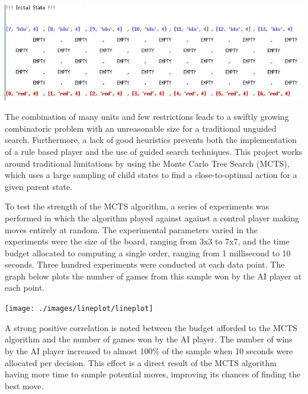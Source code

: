 \documentclass[landscape,final,a0paper,12pt]{baposter}
\begin{document}
\begin{poster}
{\vspace{0.3cm}

\includegraphics[width=0.9\colwidth]{./images/virtualboard_3.png}

\vspace{0.3cm}

The combination of many units and few restrictions leads to a swiftly growing combinatoric problem with an unreasonable size for a traditional unguided search.
Furthermore, a lack of good heuristics prevents both the implementation of a rule based player and the use of guided search techniques.
This project works around traditional limitations by using the Monte Carlo Tree Search (MCTS), which uses a large sampling of child states to find a close-to-optimal action for a given parent state.

}

{
To test the strength of the MCTS algorithm, a series of experiments was performed in which the algorithm played against against a control player making moves entirely at random.
The experimental parameters varied in the experiments were the size of the board, ranging from 3x3 to 7x7, and the time budget allocated to computing a single order, ranging from 1 millisecond to 10 seconds.
Three hundred experiments were conducted at each data point.
The graph below plots the number of games from this sample won by the AI player at each point.

\vspace{0.3cm}

\texttt{[image: ./images/lineplot/lineplot]}

\vspace{0.3cm}

A strong positive correlation is noted between the budget afforded to the MCTS algorithm and the number of games won by the AI player.
The number of wins by the AI player increased to almost 100\% of the sample when 10 seconds were allocated per decision.
This effect is a direct result of the MCTS algorithm having more time to sample potential moves, improving its chances of finding the best move.

}
\end{poster}
\end{document}
